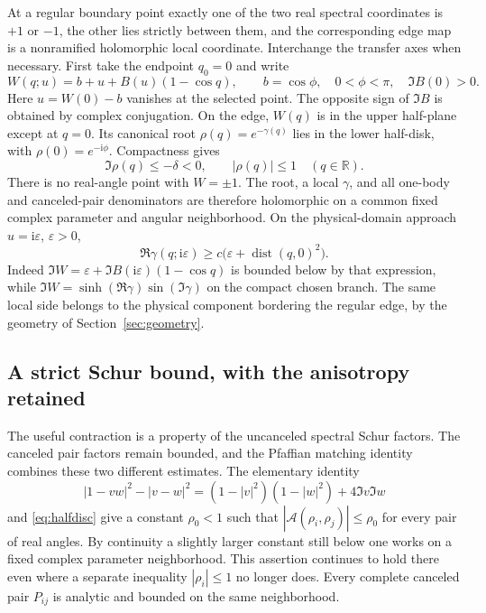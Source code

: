 \documentclass[11pt]{article}
\numberwithin{equation}{section}
\theoremstyle{definition}
\newcommand{\R}{\mathbb R}
\newcommand{\ii}{\mathrm i}
\newcommand{\eps}{\varepsilon}
\newcommand{\dist}{\operatorname{dist}}
\newcommand{\cA}{\mathscr A}
\begin{document}
At a regular boundary point exactly one of the two real spectral
coordinates is $+1$ or $-1$, the other lies strictly between them, and
the corresponding edge map is a nonramified holomorphic local
coordinate. Interchange the transfer axes when necessary. First take
the endpoint $q_0=0$ and write
\begin{equation}\label{eq:positiveedge}
 W(q;u)=b+u+B(u)(1-\cos q),\qquad
 b=\cos\phi,\quad 0<\phi<\pi,\quad \Im B(0)>0.
\end{equation}
Here $u=W(0)-b$ vanishes at the selected point. The opposite sign of
$\Im B$ is obtained by complex conjugation. On the edge, $W(q)$ is
in the upper half-plane except at $q=0$. Its canonical root
$\rho(q)=e^{-\gamma(q)}$ lies in the lower half-disk, with
$\rho(0)=e^{-\ii\phi}$. Compactness gives
\begin{equation}\label{eq:halfdisc}
 \Im\rho(q)\le-\delta<0,\qquad |\rho(q)|\le1
 \quad(q\in\R).
\end{equation}
There is no real-angle point with $W=\pm1$. The root, a local
$\gamma$, and all one-body and canceled-pair denominators are therefore
holomorphic on a common fixed complex parameter and angular
neighborhood. On the physical-domain approach $u=\ii\eps$, $\eps>0$,
\begin{equation}\label{eq:attenuation}
 \Re\gamma(q;\ii\eps)\ge c\bigl(\eps+\dist(q,0)^2\bigr).
\end{equation}
Indeed $\Im W=\eps+\Im B(\ii\eps)(1-\cos q)$ is bounded below by
that expression, while
$\Im W=\sinh(\Re\gamma)\sin(\Im\gamma)$ on the compact chosen branch.
The same local side belongs to the physical component bordering the
regular edge, by the geometry of Section~\ref{sec:geometry}.

\subsection{A strict Schur bound, with the anisotropy retained}

The useful contraction is a property of the uncanceled spectral Schur
factors. The canceled pair factors remain bounded, and the Pfaffian
matching identity combines these two different estimates.
The elementary identity
\begin{equation}\label{eq:schurdifference}
 |1-vw|^2-|v-w|^2
 =(1-|v|^2)(1-|w|^2)+4\Im v\Im w
\end{equation}
and \eqref{eq:halfdisc} give a constant $\rho_0<1$ such that
$|\cA(\rho_i,\rho_j)|\le\rho_0$ for every pair of real angles.
By continuity a slightly larger constant still below one works on a
fixed complex parameter neighborhood. This assertion continues to hold
there even where a separate inequality $|\rho_i|\le1$ no longer does.
Every complete canceled pair $P_{ij}$ is analytic and bounded on the
same neighborhood.
\end{document}
